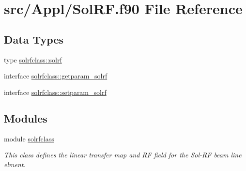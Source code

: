 \hypertarget{_sol_r_f_8f90}{}\section{src/\+Appl/\+Sol\+RF.f90 File Reference}
\label{_sol_r_f_8f90}
\subsection*{Data Types}
\begin{DoxyCompactItemize}
\item 
type \mbox{\hyperlink{namespacesolrfclass_structsolrfclass_1_1solrf}{solrfclass\+::solrf}}
\item 
interface \mbox{\hyperlink{interfacesolrfclass_1_1getparam__solrf}{solrfclass\+::getparam\+\_\+solrf}}
\item 
interface \mbox{\hyperlink{interfacesolrfclass_1_1setparam__solrf}{solrfclass\+::setparam\+\_\+solrf}}
\end{DoxyCompactItemize}
\subsection*{Modules}
\begin{DoxyCompactItemize}
\item 
module \mbox{\hyperlink{namespacesolrfclass}{solrfclass}}
\begin{DoxyCompactList}\small\item\em This class defines the linear transfer map and RF field for the Sol-\/\+RF beam line elment. \end{DoxyCompactList}\end{DoxyCompactItemize}
